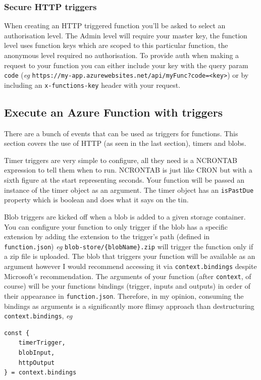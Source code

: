 \documentclass{article}
\newcommand{\code}{\texttt}
\begin{document}
\subsubsection{Secure HTTP triggers}
When creating an HTTP triggered function you'll be asked to select an authorisation level. The Admin level will require your master key, the function level uses function keys which are scoped to this particular function, the anonymous level required no authorisation. To provide auth when making a request to your function you can either include your key with the query param \code{code} (\textit{eg} \code{https://my-app.azurewebsites.net/api/myFunc?code=<key>}) or by including an \code{x-functions-key} header with your request.

\subsection{Execute an Azure Function with triggers}
There are a bunch of events that can be used as triggers for functions. This section covers the use of HTTP (as seen in the last section), timers and blobs. 

Timer triggers are very simple to configure, all they need is a NCRONTAB expression to tell them when to run. NCRONTAB is just like CRON but with a sixth figure at the start representing seconds. Your function will be passed an instance of the timer object as an argument. The timer object has an \code{isPastDue} property which is boolean and does what it says on the tin. 

Blob triggers are kicked off when a blob is added to a given storage container. You can configure your function to only trigger if the blob has a specific extension by adding the extension to the trigger's path (defined in \code{function.json}) \textit{eg} \code{blob-store/\{blobName\}.zip} will trigger the function only if a zip file is uploaded. The blob that triggers your function will be available as an argument however I would recommend accessing it via \code{context.bindings} despite Microsoft's recommendation. The arguments of your function (after \code{context}, of course) will be your functions bindings (trigger, inputs and outputs) in order of their appearance in \code{function.json}. Therefore, in my opinion, consuming the bindings as arguments is a significantly more flimsy approach than destructuring \code{context.bindings}, \textit{eg}

\begin{lstlisting}
const { 
    timerTrigger, 
    blobInput, 
    httpOutput 
} = context.bindings
\end{lstlisting}
\end{document}
